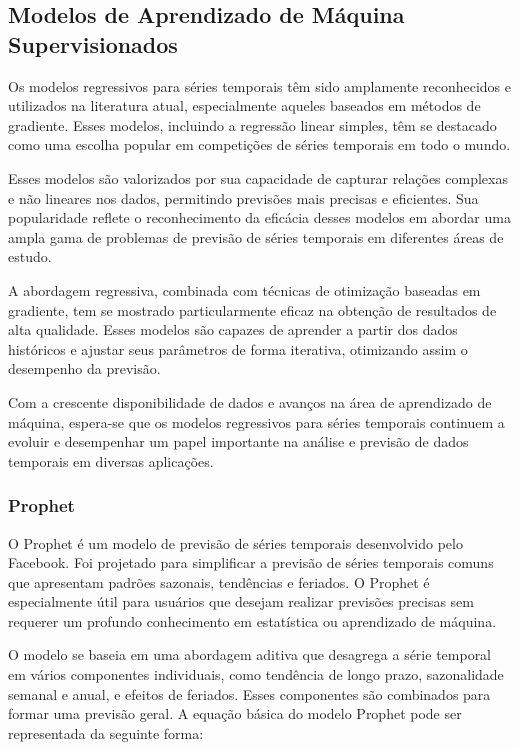 \subsection{Modelos de Aprendizado de M\'aquina Supervisionados}\label{subsec:reg}

Os modelos regressivos para séries temporais têm sido amplamente reconhecidos e utilizados na literatura atual, especialmente aqueles baseados em métodos de gradiente. Esses modelos, incluindo a regressão linear simples, têm se destacado como uma escolha popular em competições de séries temporais em todo o mundo.

Esses modelos são valorizados por sua capacidade de capturar relações complexas e não lineares nos dados, permitindo previsões mais precisas e eficientes. Sua popularidade reflete o reconhecimento da eficácia desses modelos em abordar uma ampla gama de problemas de previsão de séries temporais em diferentes áreas de estudo.

A abordagem regressiva, combinada com técnicas de otimização baseadas em gradiente, tem se mostrado particularmente eficaz na obtenção de resultados de alta qualidade. Esses modelos são capazes de aprender a partir dos dados históricos e ajustar seus parâmetros de forma iterativa, otimizando assim o desempenho da previsão.

Com a crescente disponibilidade de dados e avanços na área de aprendizado de máquina, espera-se que os modelos regressivos para séries temporais continuem a evoluir e desempenhar um papel importante na análise e previsão de dados temporais em diversas aplicações.

\subsubsection{Prophet}


O Prophet é um modelo de previsão de séries temporais desenvolvido pelo Facebook. Foi projetado para simplificar a previsão de séries temporais comuns que apresentam padrões sazonais, tendências e feriados. O Prophet é especialmente útil para usuários que desejam realizar previsões precisas sem requerer um profundo conhecimento em estatística ou aprendizado de máquina.

O modelo se baseia em uma abordagem aditiva que desagrega a série temporal em vários componentes individuais, como tendência de longo prazo, sazonalidade semanal e anual, e efeitos de feriados. Esses componentes são combinados para formar uma previsão geral.
A equação básica do modelo Prophet pode ser representada da seguinte forma:

